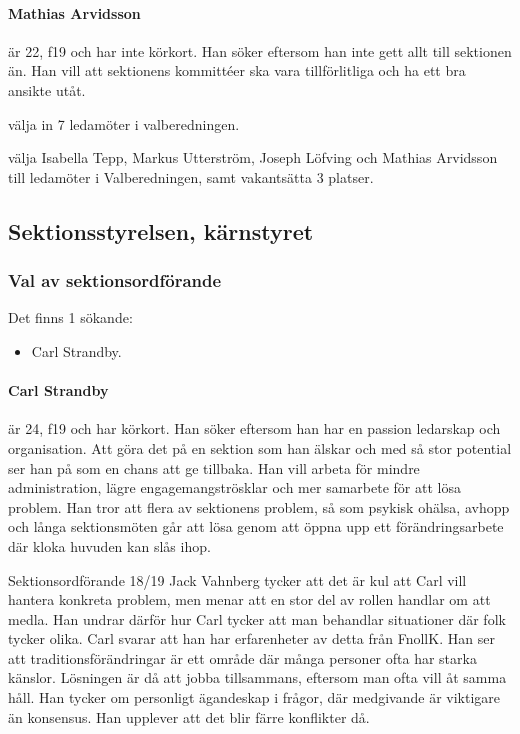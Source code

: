 \documentclass[hidelinks]{sektionsmote}
\begin{document}
\paragraph{Mathias Arvidsson} är 22, f19 och har inte körkort.
Han söker eftersom han inte gett allt till sektionen än.
Han vill att sektionens kommittéer ska vara tillförlitliga och ha ett bra ansikte utåt.

\begin{beslut}
  \item välja in 7 ledamöter i valberedningen.
  \item välja Isabella Tepp, Markus Utterström, Joseph Löfving och Mathias Arvidsson till ledamöter i Valberedningen, samt vakantsätta 3 platser.
\end{beslut}

\subsection{Sektionsstyrelsen, kärnstyret}

\subsubsection{Val av sektionsordförande}
Det finns 1 sökande:
\begin{itemize}
    \item Carl Strandby.
\end{itemize}

\paragraph{Carl Strandby} är 24, f19 och har körkort.
Han söker eftersom han har en passion ledarskap och organisation.
Att göra det på en sektion som han älskar och med så stor potential ser han på som en chans att ge tillbaka.
Han vill arbeta för mindre administration, lägre engagemangströsklar och mer samarbete för att lösa problem.
Han tror att flera av sektionens problem, så som psykisk ohälsa, avhopp och långa sektionsmöten går att lösa genom att öppna upp ett förändringsarbete där kloka huvuden kan slås ihop.

Sektionsordförande 18/19 Jack Vahnberg tycker att det är kul att Carl vill hantera konkreta problem, men menar att en stor del av rollen handlar om att medla.
Han undrar därför hur Carl tycker att man behandlar situationer där folk tycker olika.
Carl svarar att han har erfarenheter av detta från FnollK.
Han ser att traditionsförändringar är ett område där många personer ofta har starka känslor.
Lösningen är då att jobba tillsammans, eftersom man ofta vill åt samma håll.
Han tycker om personligt ägandeskap i frågor, där medgivande är viktigare än konsensus.
Han upplever att det blir färre konflikter då.
\end{document}
